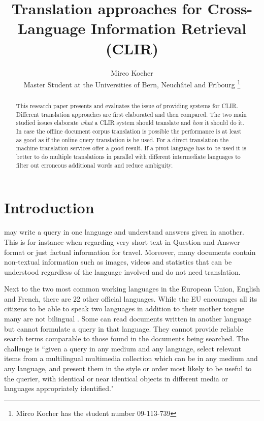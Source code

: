 \documentclass[journal]{IEEEtran}
\begin{document}
\title{Translation approaches for Cross-Language Information Retrieval (CLIR)}

\author{Mirco Kocher\\
Master Student at the Universities of Bern, Neuch\^{a}tel and Fribourg
\thanks{Mirco Kocher has the student number 09-113-739} %
}


\maketitle



\begin{abstract}
This research paper presents and evaluates the issue of providing systems for CLIR.
Different translation approaches are first elaborated and then compared.
The two main studied issues elaborate \textit{what} a CLIR system should translate and \textit{how} it should do it.
In case the offline document corpus translation is possible the performance is at least as good as if the online query translation is be used.
For a direct translation the machine translation services offer a good result.
If a pivot language has to be used it is better to do multiple translations in parallel with different intermediate languages to filter out erroneous additional words and reduce ambiguity.
\end{abstract}



\section{Introduction}
 may write a query in one language and understand answers given in another.
This is for instance when regarding very short text in Question and Answer format or just factual information for travel.
Moreover, many documents contain non-textual information such as images, videos and statistics that can be understood regardless of the language involved and do not need translation.

Next to the two most common working languages in the European Union, English and French, there are 22 other official languages.
While the EU encourages all its citizens to be able to speak two languages in addition to their mother tongue many are not bilingual \cite{ebs386}.
Some can read documents written in another language but cannot formulate a query in that language.
They cannot provide reliable search terms comparable to those found in the documents being searched.
The challenge is ``given a query in any medium and any language, select relevant items from a multilingual multimedia collection which can be in any medium and any language, and present them in the style or order most likely to be useful to the querier, with identical or near identical objects in different media or languages appropriately identified." \cite{oard97a}
\end{document}

